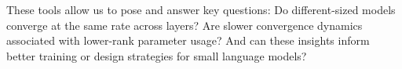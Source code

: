 These tools allow us to pose and answer key questions: Do different-sized models converge at the same rate across layers? Are slower convergence dynamics associated with lower-rank parameter usage? And can these insights inform better training or design strategies for small language models?










